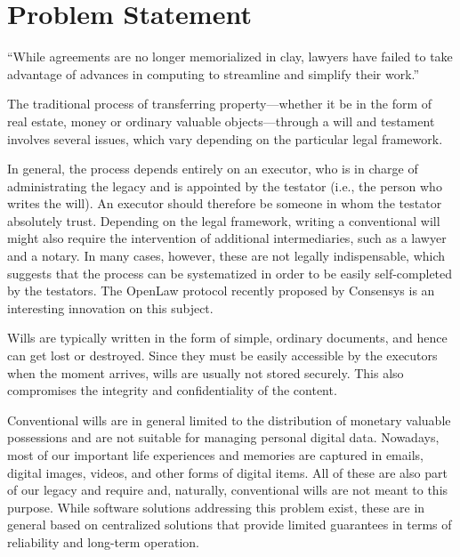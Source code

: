 \section{Problem Statement} %
\label{sec:problem_statement}

\begin{savequote}[0.55\linewidth]
	``While agreements are no longer memorialized in clay, lawyers have failed to take advantage of advances in computing to streamline and simplify their work.''
\end{savequote}

The traditional process of transferring property---whether it be in the form of real estate, money or ordinary valuable objects---through a will and testament involves several issues, which vary depending on the particular legal framework. 

In general, the process depends entirely on an executor, who is in charge of administrating the legacy and is appointed by the testator (i.e., the person who writes the will). An executor should therefore be someone in whom the testator absolutely trust. Depending on the legal framework, writing a conventional will might also require the intervention of additional  intermediaries, such as a lawyer and a notary. In many cases, however, these are not legally indispensable, which suggests that the process can be systematized in order to be easily self-completed by the testators. The OpenLaw protocol recently proposed by Consensys \cite{OpenLaw} is an interesting innovation on this subject. 

Wills are typically written in the form of simple, ordinary documents, and hence can get lost or destroyed. Since they must be easily accessible by the executors when the moment arrives, wills are usually not stored securely. This also compromises the integrity and confidentiality of the content.
  
Conventional wills are in general limited to the distribution of monetary valuable possessions and are not suitable for managing personal digital data. Nowadays, most of our important life experiences and memories are captured in emails, digital images, videos,  and other forms of digital items. All of these are also part of our legacy and require  and, naturally, conventional wills are not meant to this purpose. While software solutions addressing this problem exist, these are in general based on centralized solutions that provide limited guarantees in terms of reliability and long-term operation.


